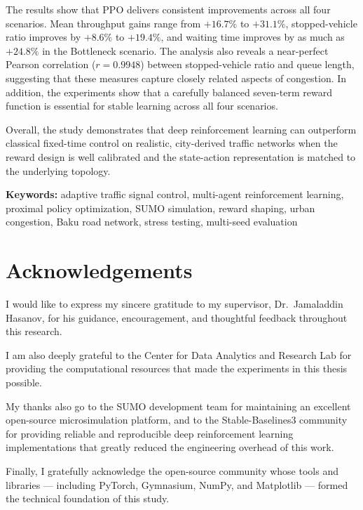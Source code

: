\documentclass[12pt,oneside,a4paper]{report}
\newcommand{\ppo}{\textsc{PPO}}
\newcommand{\sumo}{\textsc{SUMO}}
\begin{document}
The results show that \ppo{} delivers consistent improvements across all
four scenarios. Mean throughput gains range from $+16.7\%$ to $+31.1\%$,
stopped-vehicle ratio improves by $+8.6\%$ to $+19.4\%$, and waiting time
improves by as much as $+24.8\%$ in the Bottleneck scenario. The analysis
also reveals a near-perfect Pearson correlation ($r = 0.9948$) between
stopped-vehicle ratio and queue length, suggesting that these measures
capture closely related aspects of congestion. In addition, the experiments
show that a carefully balanced seven-term reward function is essential for
stable learning across all four scenarios.

Overall, the study demonstrates that deep reinforcement learning can
outperform classical fixed-time control on realistic, city-derived traffic
networks when the reward design is well calibrated and the state-action
representation is matched to the underlying topology.

\vspace{0.3in}
\noindent\textbf{Keywords:}
adaptive traffic signal control, multi-agent reinforcement
learning, proximal policy optimization, SUMO simulation,
reward shaping, urban congestion, Baku road network,
stress testing, multi-seed evaluation

\chapter*{Acknowledgements}

I would like to express my sincere gratitude to my supervisor,
Dr.\ Jamaladdin Hasanov, for his guidance, encouragement, and
thoughtful feedback throughout this research.

I am also deeply grateful to the Center for Data Analytics and
Research Lab for providing the computational resources that made
the experiments in this thesis possible.

My thanks also go to the \sumo{} development team for maintaining an
excellent open-source microsimulation platform, and to the
Stable-Baselines3 community for providing reliable and reproducible
deep reinforcement learning implementations that greatly reduced the
engineering overhead of this work.

Finally, I gratefully acknowledge the open-source community whose
tools and libraries --- including PyTorch, Gymnasium, NumPy, and
Matplotlib --- formed the technical foundation of this study.
\end{document}
